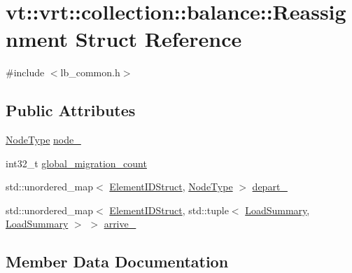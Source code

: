 \hypertarget{structvt_1_1vrt_1_1collection_1_1balance_1_1_reassignment}{}\section{vt\+:\+:vrt\+:\+:collection\+:\+:balance\+:\+:Reassignment Struct Reference}
\label{structvt_1_1vrt_1_1collection_1_1balance_1_1_reassignment}


{\ttfamily \#include $<$lb\+\_\+common.\+h$>$}

\subsection*{Public Attributes}
\begin{DoxyCompactItemize}
\item 
\hyperlink{namespacevt_a866da9d0efc19c0a1ce79e9e492f47e2}{Node\+Type} \hyperlink{structvt_1_1vrt_1_1collection_1_1balance_1_1_reassignment_ab94b05ac3a28d21a1f189f4becbe1240}{node\+\_\+}
\item 
int32\+\_\+t \hyperlink{structvt_1_1vrt_1_1collection_1_1balance_1_1_reassignment_a4887608a57a19a896481f22d2ad11ce2}{global\+\_\+migration\+\_\+count}
\item 
std\+::unordered\+\_\+map$<$ \hyperlink{namespacevt_1_1vrt_1_1collection_1_1balance_a9f5b53fafb270212279a4757d2c4cd28}{Element\+I\+D\+Struct}, \hyperlink{namespacevt_a866da9d0efc19c0a1ce79e9e492f47e2}{Node\+Type} $>$ \hyperlink{structvt_1_1vrt_1_1collection_1_1balance_1_1_reassignment_a8fa0e732209e0f186eb10a15b29a0914}{depart\+\_\+}
\item 
std\+::unordered\+\_\+map$<$ \hyperlink{namespacevt_1_1vrt_1_1collection_1_1balance_a9f5b53fafb270212279a4757d2c4cd28}{Element\+I\+D\+Struct}, std\+::tuple$<$ \hyperlink{structvt_1_1vrt_1_1collection_1_1balance_1_1_load_summary}{Load\+Summary}, \hyperlink{structvt_1_1vrt_1_1collection_1_1balance_1_1_load_summary}{Load\+Summary} $>$ $>$ \hyperlink{structvt_1_1vrt_1_1collection_1_1balance_1_1_reassignment_ab8bc2db019b38f52131852990e2f5d7b}{arrive\+\_\+}
\end{DoxyCompactItemize}


\subsection{Member Data Documentation}
\mbox{\label{structvt_1_1vrt_1_1collection_1_1balance_1_1_reassignment_ab8bc2db019b38f52131852990e2f5d7b}} 
